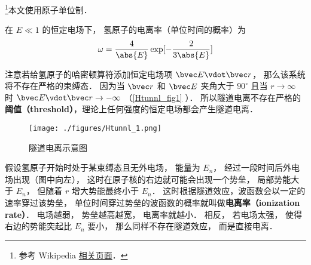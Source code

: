 
\footnote{参考 Wikipedia \href{https://en.wikipedia.org/wiki/Tunnel_ionization}{相关页面}．}本文使用原子单位制．

在 $E \ll 1$ 的恒定电场下， 氢原子的电离率（单位时间的概率）为
\begin{equation}
\omega = \frac{4}{\abs{E}} \exp[-\frac{2}{3\abs{E}}]
\end{equation}

注意若给氢原子的哈密顿算符添加恒定电场项 $\bvec E \vdot \bvec r$， 那么该系统将不存在严格的束缚态． 因为当 $\bvec r$ 和 $\bvec E$ 夹角大于 $90^\circ$ 且当 $r\to\infty$ 时 $\bvec E \vdot \bvec r \to -\infty$ （\autoref{Htunnl_fig1} ）． 所以隧道电离不存在严格的\textbf{阈值（threshold）}，理论上任何强度的恒定电场都会产生隧道电离．

\begin{figure}[ht]
\centering
\texttt{[image: ./figures/Htunnl\_1.png]}
\caption{隧道电离示意图} \label{Htunnl_fig1}
\end{figure}

假设氢原子开始时处于某束缚态且无外电场， 能量为 $E_n$， 经过一段时间后外电场出现（图中向左）， 这时在原子核的右边就可能会出现一个势垒， 局部势能大于 $E_n$， 但随着 $r$ 增大势能最终小于 $E_n$． 这时根据隧道效应，波函数会以一定的速率穿过该势垒， 单位时间穿过势垒的波函数的概率就叫做\textbf{电离率（ionization rate）}． 电场越弱， 势垒越高越宽， 电离率就越小． 相反， 若电场太强， 使得右边的势能突起比 $E_n$ 要小， 那么同样不存在隧道效应， 而是直接电离．
